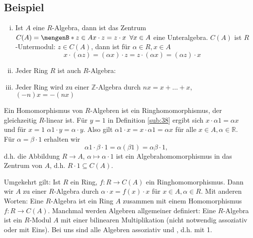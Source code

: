 \subsection[Beispiele für Algebren]{Beispiel} %
\label{sub:39}
\begin{enumerate}[(i)]
	\item Ist $A$ eine $R$-Algebra, dann ist das Zentrum $C(A) = \set[z \in A]{x \cdot z = z \cdot x \enspace \forall x \in A} $ eine Unteralgebra. 
	$C(A)$ ist $R$-Untermodul: $z \in C(A)$, dann ist für $\alpha \in R, x \in A$
		\[
			x \cdot (\alpha z) = (\alpha x) \cdot z = z \cdot (\alpha x) = (\alpha z) \cdot x
		\]
	\item Jeder Ring $R$ ist auch $R$-Algebra: 
	\item Jeder Ring wird zu einer $\mathds{Z}$-Algebra durch $n x = x + \ldots + x$, $(-n) x = - (n x)$
\end{enumerate}
Ein Homomorphismus von $R$-Algebren ist ein Ringhomomorphismus, der gleichzeitig $R$-linear ist.
Für $y=1$ in Definition \ref{sub:38} ergibt sich $x \cdot  \alpha 1 = \alpha x$ und für $x=1$ $\alpha 1 \cdot y = \alpha \cdot y$. Also gilt 
$\alpha 1  \cdot x = x \cdot  \alpha 1 = \alpha x$ für alle $x \in A, \alpha \in \mathds{R}$. Für $\alpha = \beta \cdot 1$ erhalten wir 
\[
	\alpha 1 \cdot \beta \cdot 1 = \alpha (\beta 1) = \alpha \beta \cdot 1,
\]
d.h. die Abbildung $R \to A$, $\alpha \mapsto \alpha \cdot 1$ ist ein Algebrahomomorphismus in das Zentrum von $A$, d.h. $R \cdot 1 \subseteq C(A)$.

Umgekehrt gilt: Ist $R$ ein Ring, $f : R \to C(A)$ ein Ringhomomorphismus. Dann wir $A$ zu einer $R$-Algebra durch $\alpha \cdot x = f(x) \cdot x$ für $x\in A,\alpha\in R$.
Mit anderen Worten: Eine $R$-Algebra ist ein Ring $A$ zusammen mit einem Homomorphismus $f : R \to C(A)$. Manchmal werden Algebren allgemeiner definiert: Eine $R$-Algebra 
ist ein $R$-Modul $A$ mit einer bilinearen Multiplikation (nicht notwendig assoziativ oder mit Eins). Bei uns sind alle Algebren assoziativ und , d.h. mit 1. 

